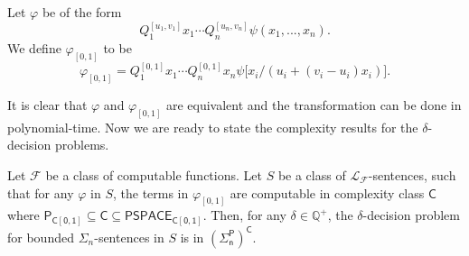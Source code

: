 \documentclass[prodmode]{acmsmall} %
\begin{document}

\begin{definition}
Let $\varphi$ be of the form 
$$Q_1^{[u_1,v_1]}x_1 \cdots Q_n^{[u_n,v_n]}\psi(x_1,...,x_n).$$ 
We define $\varphi_{[0,1]}$ to be 
$$\varphi_{[0,1]} = Q_1^{[0,1]} x_1 \cdots Q_n^{[0,1]}x_n\psi\big[x_i\big/(u_i+(v_i-u_i)x_i)\big].$$
\end{definition} 

It is clear that $\varphi$ and $\varphi_{[0,1]}$ are equivalent and the transformation can be done in polynomial-time. Now we are ready to state the complexity results for the $\delta$-decision problems. 

\begin{theorem}\label{compmain}
Let $\mathcal{F}$ be a class of computable functions. Let $S$ be a class of $\mathcal{L}_{\mathcal{F}}$-sentences, such that for any $\varphi$ in $S$, the terms in $\varphi_{[0,1]}$ are computable in complexity class $\mathsf{C}$ where $\mathsf{P_{C[0,1]}\subseteq \mathsf{C}\subseteq \mathsf{PSPACE_{C[0,1]}}}$. Then, for any $\delta\in \mathbb{Q}^+$, the $\delta$-decision problem for bounded $\Sigma_n$-sentences in $S$ is in $\mathsf{(\Sigma_n^P)^C}$.
\end{theorem}
\end{document}

